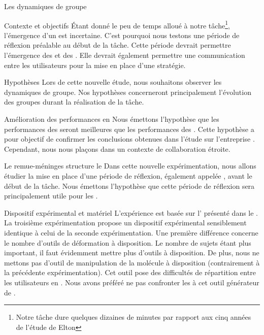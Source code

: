 \documentclass[myfrancais]{mythesis}
\begin{document}
\begin{mychapter}{Les dynamiques de groupe}
\begin{mysection}{Contexte et objectifs}
			Étant donné le peu de temps alloué à notre tâche\footnote{Notre tâche dure quelques dizaines de minutes par rapport aux cinq années de l'étude de Elton }, l'émergence d'un  est incertaine.
			C'est pourquoi nous testons une période de réflexion préalable au début de la tâche.
			Cette période devrait permettre l'émergence des  et des .
			Elle devrait également permettre une communication entre les utilisateurs pour la mise en place d'une stratégie.
			\begin{mysubsection}{Hypothèses}
				Lors de cette nouvelle étude, nous souhaitons observer les dynamiques de groupe.
				Nos hypothèses concerneront principalement l'évolution des groupes durant la réalisation de la tâche.
				\begin{myparagraph}{ Amélioration des performances en }
					Nous émettons l'hypothèse que les performances des  seront meilleures que les performances des .
					Cette hypothèse a pour objectif de confirmer les conclusions obtenues dans l'étude sur l'entreprise \myHawthorne.
					Cependant, nous nous plaçons dans un contexte de collaboration étroite.
				\end{myparagraph}
				\begin{myparagraph}{ Le remue-méninges structure le }
					Dans cette nouvelle expérimentation, nous allons étudier la mise en place d'une période de réflexion, également appelée , avant le début de la tâche.
					Nous émettons l'hypothèse que cette période de réflexion sera principalement utile pour les .
				\end{myparagraph}
			\end{mysubsection}
		\end{mysection}
		\begin{mysection}{Dispositif expérimental et matériel}
			L'expérience est basée sur l' présenté dans le .
			La troisième expérimentation propose un dispositif expérimental sensiblement identique à celui de la seconde expérimentation.
			Une première différence concerne le nombre d'outils de déformation à disposition.
			Le nombre de sujets étant plus important, il faut évidemment mettre plus d'outils à disposition.
			De plus, nous ne mettons pas d'outil de manipulation de la molécule à disposition (contrairement à la précédente expérimentation).
			Cet outil pose des difficultés de répartition entre les utilisateurs en .
			Nous avons préféré ne pas confronter les  à cet outil générateur de .


\end{mysection}
\end{mychapter}
\end{document}
